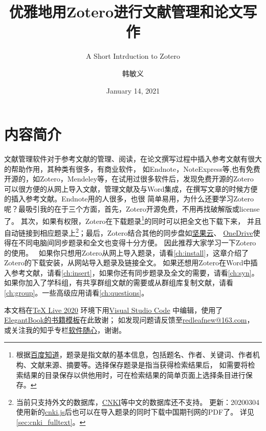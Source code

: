 \documentclass[cn,11pt,chinese]{elegantbook}
\title{优雅地用Zotero进行文献管理和论文写作}
\subtitle{A Short Intrduction to Zotero}
\author{韩敏义}
\institute{南京农业大学\\\kaishu\hspace{1.1cm}温氏食品集团股份有限公司}
\date{January 14, 2021}
\begin{document}
 
\maketitle
\frontmatter

  \chapter*{内容简介}
	
		文献管理软件对于参考文献的管理、阅读，在论文撰写过程中插入参考文献有很大的帮助作用，其种类有很多，有商业软件，
		如Endnote，NoteExpress等,也有免费开源的，如Zotero，Mendeley等，在试用过很多软件后，发现免费开源的Zotero
		可以很方便的从网上导入文献，管理文献及与Word集成，在撰写文章的时候方便的插入参考文献。Endnote用的人很多，也很
		简单易用，为什么还要学习Zotero呢？最吸引我的在于三个方面，首先，Zotero开源免费，不用再找破解版或license了。
		其次，如果有权限，Zotero在下载题录\footnote{根据\href{https://zhidao.baidu.com/question/443193991.html}
		{百度知道}，题录是指文献的基本信息，包括题名、作者、关键词、作者机构、文献来源、摘要等。选择保存题录是指当获得检索结果后，
		如需要将检索结果的目录保存以供他用时，可在检索结果的简单页面上选择条目进行保存。}的同时可以把全文也下载下来，
		并且自动链接到相应题录上\footnote{当前只支持外文的数据库，\href{http://www.cnki.net}{CNKI}等中文的数据库还不支持。
		更新：20200304 使用新的\href{https://github.com/Zotero-CN/translators_CN}{cnki.js}后也可以在导入题录的同时下载中国期刊网的PDF了。
		详见\cref{sec:cnki_fulltext}。}；最后，Zotero结合其他的同步盘如\href{https://www.jianguoyun.com}{坚果云}、
		\href{https://office.live.com/start/OneDrive.aspx}{OneDrive}使得在不同电脑间同步题录和全文也变得十分方便。
		因此推荐大家学习一下Zotero的使用。
		\
		如果你只想用Zotero从网上导入题录，请看\cref{ch:install}，这章介绍了Zotero的下载安装，从网站导入题录及链接全文。
		如果还想用Zotero在Word中插入参考文献，请看\cref{ch:insert}，如果你还有同步题录及全文的需要，请看\cref{ch:syn}。
		如果你加入了学科组，有共享群组文献的需要或从群组库复制文献，请看\cref{ch:group}。一些高级应用请看\cref{ch:questions}。
		
		
		本文档在\href{http://tug.org/texlive/}{\TeX{} Live 2020} 环境下用\href{https://code.visualstudio.com/}{Visual Studio Code}
		中编辑，使用了\href{https://elegantlatex.org/}{ElegantBook的书籍模板}在此致谢；
		如发现问题请反馈至\href{mailto:redleafnew@163.com}{redleafnew@163.com}，
		或关注我的知乎专栏\href{https://zhuanlan.zhihu.com/c_1071081428967743488}{软件随心}，谢谢。

\tableofcontents
\end{document}
